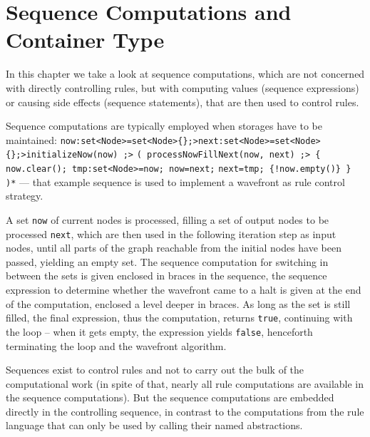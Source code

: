 
\chapter{Sequence Computations and Container Type}\label{seqcomp}

In this chapter we take a look at sequence computations, which are not concerned with directly controlling rules, but with computing values (sequence expressions) or causing side effects (sequence statements), that are then used to control rules.

\begin{example}
Sequence computations are typically employed when storages have to be maintained:
\verb#now:set<Node>=set<Node>{};>next:set<Node>=set<Node>{};>initializeNow(now) ;>#
\verb#( processNowFillNext(now, next) ;> { now.clear(); tmp:set<Node>=now; now=next;#
\verb#next=tmp; {!now.empty()} } )*#
--- that example sequence is used to implement a wavefront as rule control strategy.

A set \texttt{now} of current nodes is processed, filling a set of output nodes to be processed \texttt{next}, which are then used in the following iteration step as input nodes, until all parts of the graph reachable from the initial nodes have been passed, yielding an empty set.
The sequence computation for switching in between the sets is given enclosed in braces in the sequence, 
the sequence expression to determine whether the wavefront came to a halt is given at the end of the computation,
enclosed a level deeper in braces.
As long as the set is still filled, the final expression, thus the computation, returns \texttt{true}, continuing with the loop -- when it gets empty, the expression yields \texttt{false}, henceforth terminating the loop and the wavefront algorithm.
\end{example}

Sequences exist to control rules and not to carry out the bulk of the computational work (in spite of that, nearly all rule computations are available in the sequence computations).
But the sequence computations are embedded directly in the controlling sequence, in contrast to the computations from the rule language that can only be used by calling their named abstractions.

